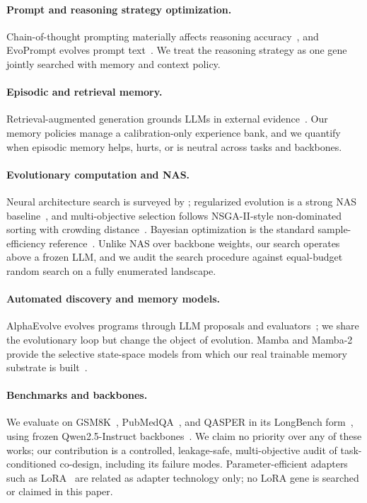 \documentclass[11pt]{article}
\begin{document}
\paragraph{Prompt and reasoning strategy optimization.}
Chain-of-thought prompting materially affects reasoning
accuracy~\citep{wei2022cot}, and EvoPrompt evolves prompt
text~\citep{guo2024evoprompt}. We treat the reasoning strategy as one gene
jointly searched with memory and context policy.

\paragraph{Episodic and retrieval memory.}
Retrieval-augmented generation grounds LLMs in external
evidence~\citep{lewis2020rag}. Our memory policies manage a
calibration-only experience bank, and we quantify when episodic memory
helps, hurts, or is neutral across tasks and backbones.

\paragraph{Evolutionary computation and NAS.}
Neural architecture search is surveyed by \citet{elsken2019nas};
regularized evolution is a strong NAS baseline~\citep{real2019ameoba}, and
multi-objective selection follows NSGA-II-style non-dominated sorting with
crowding distance~\citep{deb2002nsga2}. Bayesian optimization is the
standard sample-efficiency reference~\citep{shahriari2016bayesopt}. Unlike
NAS over backbone weights, our search operates above a frozen LLM, and we
audit the search procedure against equal-budget random search on a fully
enumerated landscape.

\paragraph{Automated discovery and memory models.}
AlphaEvolve evolves programs through LLM proposals and
evaluators~\citep{alphaevolve2025}; we share the evolutionary loop but
change the object of evolution. Mamba and Mamba-2 provide the selective
state-space models from which our real trainable memory substrate is
built~\citep{gu2023mamba,dao2024mamba2}.

\paragraph{Benchmarks and backbones.}
We evaluate on GSM8K~\citep{cobbe2021gsm8k}, PubMedQA~\citep{jin2019pubmedqa},
and QASPER in its LongBench form~\citep{dasigi2021qasper,bai2023longbench},
using frozen Qwen2.5-Instruct backbones~\citep{yang2024qwen25}. We claim no
priority over any of these works; our contribution is a controlled,
leakage-safe, multi-objective audit of task-conditioned co-design, including
its failure modes. Parameter-efficient adapters such as
LoRA~\citep{hu2021lora} are related as adapter technology only; no LoRA gene
is searched or claimed in this paper.
\end{document}
